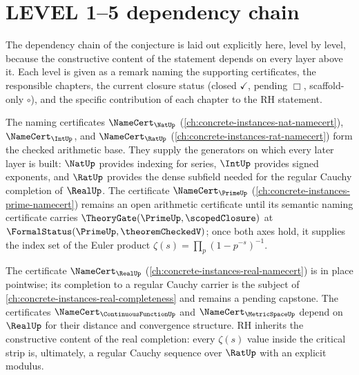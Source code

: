 \section{LEVEL 1--5 dependency chain}
\label{sec:rh-dependency-chain}

The dependency chain of the conjecture is laid out explicitly here, level by level, because the constructive content of the statement depends on every layer above it. Each level is given as a remark naming the supporting certificates, the responsible chapters, the current closure status (closed $\checkmark$, pending $\Box$, scaffold-only $\circ$), and the specific contribution of each chapter to the RH statement.

\begin{remark}
\label{rem:rh-level-1}
The naming certificates $\NameCert_{\NatUp}$ (\autoref{ch:concrete-instances-nat-namecert}), $\NameCert_{\IntUp}$, and $\NameCert_{\RatUp}$ (\autoref{ch:concrete-instances-rat-namecert}) form the checked arithmetic base. They supply the generators on which every later layer is built: $\NatUp$ provides indexing for series, $\IntUp$ provides signed exponents, and $\RatUp$ provides the dense subfield needed for the regular Cauchy completion of $\RealUp$. The certificate $\NameCert_{\PrimeUp}$ (\autoref{ch:concrete-instances-prime-namecert}) remains an open arithmetic certificate until its semantic naming certificate carries $\TheoryGate(\PrimeUp, \scopedClosure)$ at $\FormalStatus(\PrimeUp, \theoremCheckedV)$; once both axes hold, it supplies the index set of the Euler product $\zeta(s) = \prod_{p} (1 - p^{-s})^{-1}$.
\end{remark}

\begin{remark}
\label{rem:rh-level-2}
The certificate $\NameCert_{\RealUp}$ (\autoref{ch:concrete-instances-real-namecert}) is in place pointwise; its completion to a regular Cauchy carrier is the subject of \autoref{ch:concrete-instances-real-completeness} and remains a pending capstone. The certificates $\NameCert_{\ContinuousFunctionUp}$ and $\NameCert_{\MetricSpaceUp}$ depend on $\RealUp$ for their distance and convergence structure. RH inherits the constructive content of the real completion: every $\zeta(s)$ value inside the critical strip is, ultimately, a regular Cauchy sequence over $\RatUp$ with an explicit modulus.
\end{remark}

